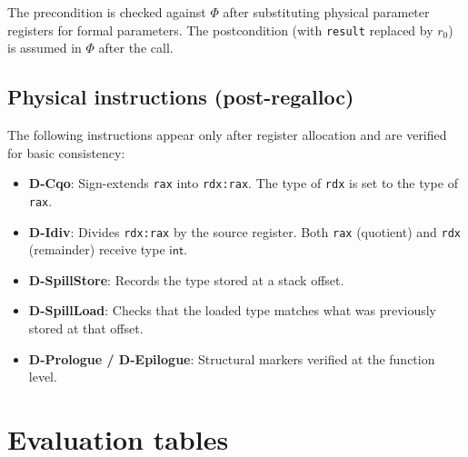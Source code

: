 \noindent The precondition is checked against $\Phi$ after substituting physical parameter registers for formal parameters. The postcondition (with \texttt{result} replaced by $r_0$) is assumed in $\Phi$ after the call.

\section*{Physical instructions (post-regalloc)}

The following instructions appear only after register allocation and are verified for basic consistency:

\begin{itemize}
  \item \textbf{D-Cqo}: Sign-extends \texttt{rax} into \texttt{rdx:rax}. The type of \texttt{rdx} is set to the type of \texttt{rax}.
  \item \textbf{D-Idiv}: Divides \texttt{rdx:rax} by the source register. Both \texttt{rax} (quotient) and \texttt{rdx} (remainder) receive type $\textsf{int}$.
  \item \textbf{D-SpillStore}: Records the type stored at a stack offset.
  \item \textbf{D-SpillLoad}: Checks that the loaded type matches what was previously stored at that offset.
  \item \textbf{D-Prologue / D-Epilogue}: Structural markers verified at the function level.
\end{itemize}

\chapter{Evaluation tables}


